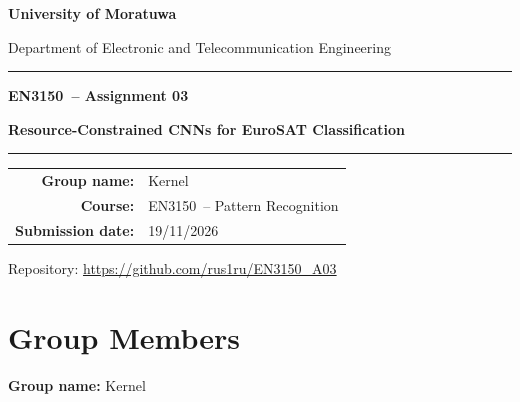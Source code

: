 \documentclass[11pt,a4paper]{article}
\newcommand{\GroupNumber}{Kernel}
\newcommand{\SubmissionDate}{19/11/2026}
\newcommand{\CourseCode}{EN3150}
\newcommand{\CourseTitle}{Pattern Recognition}
\newcommand{\AssignmentNumber}{Assignment 03}
\newcommand{\AssignmentTitle}{Resource-Constrained CNNs for EuroSAT Classification}
\newcommand{\Department}{Department of Electronic and Telecommunication Engineering}
\newcommand{\University}{University of Moratuwa}
\begin{document}
\begin{titlepage}
 \centering
 \vspace*{1.4cm}
 {\Large\bfseries \University\par}
 \vspace{0.35cm}
 {\large \Department\par}
 \vfill
 {\color{accent}\rule{0.88\textwidth}{1.2pt}\par}
 \vspace{0.7cm}
 {\LARGE\bfseries \CourseCode\ -- \AssignmentNumber\par}
 \vspace{0.6cm}
 {\Large\bfseries \AssignmentTitle\par}
 \vspace{0.7cm}
 {\color{accent}\rule{0.88\textwidth}{1.2pt}\par}
 \vfill
 \begin{tabular}{>{\bfseries}rl}
 Group name: & \GroupNumber \\
 Course: & \CourseCode\ -- \CourseTitle \\
 Submission date: & \SubmissionDate
 \end{tabular}\par
 \vspace{0.6cm}
 {\small Repository: \url{https://github.com/rus1ru/EN3150_A03}\par}
 \vfill
\end{titlepage}
\section*{Group Members}
\textbf{Group name:} \GroupNumber
\end{document}
